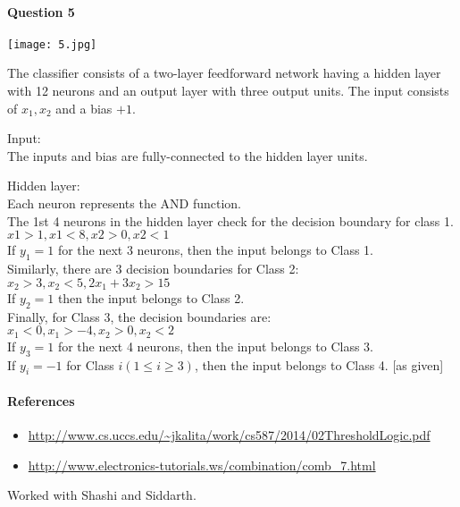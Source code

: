 \documentclass[12pt]{article}
\begin{document}
\paragraph{Question 5}
\begin{center}
        \texttt{[image: 5.jpg]}
\end{center}
The classifier consists of a two-layer feedforward network having a hidden layer with 12 neurons and an output layer with three output units. The input consists of $x_1, x_2$ and a bias $+1$.

Input: \\
The inputs and bias are fully-connected to the hidden layer units. 

Hidden layer: \\
Each neuron represents the AND function. \\
The 1st 4 neurons in the hidden layer check for the decision boundary for class 1.\\
$x1>1, x1<8, x2>0, x2<1$ \\
If $y_1=1$ for the next 3 neurons, then the input belongs to Class 1. \\
Similarly, there are 3 decision boundaries for Class 2: \\
$x_2>3,x_2<5, 2x_1 + 3x_2>15$ \\
If $y_2=1$ then the input belongs to Class 2. \\
Finally, for Class 3, the decision boundaries are: \\
$x_1<0,x_1>-4,x_2>0,x_2<2$ \\
If $y_3=1$ for the next 4 neurons, then the input belongs to Class 3. \\
If $y_i=-1$ for Class $i(1 \leq i \geq 3)$, then the input belongs to Class 4. [as given]

\paragraph{References}
\begin{itemize}
    \item \url{http://www.cs.uccs.edu/~jkalita/work/cs587/2014/02ThresholdLogic.pdf}
    \item \url{http://www.electronics-tutorials.ws/combination/comb_7.html}
\end{itemize}
Worked with Shashi and Siddarth.
\end{document}
